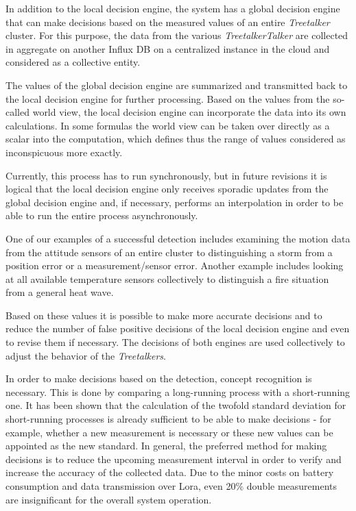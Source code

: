 In addition to the local decision engine, the system has a global decision engine that can make decisions based on the measured values of an entire \textit{Treetalker} cluster. 
For this purpose, the data from the various \textit{TreetalkerTalker} are collected in aggregate on another Influx DB on a centralized instance in the cloud and considered as a collective entity. 

The values of the global decision engine are summarized and transmitted back to the local decision engine for further processing. Based on the values from the so-called world view, the local decision engine can incorporate the data into its own calculations. In some formulas the world view can be taken over directly as a scalar into the computation, which defines thus the range of values considered as inconspicuous more exactly.

Currently, this process has to run synchronously, but in future revisions it is logical that the local decision engine only receives sporadic updates from the global decision engine and, if necessary, performs an interpolation in order to be able to run the entire process asynchronously.


One of our examples of a successful detection includes examining the motion data from the attitude sensors of an entire cluster to distinguishing a storm from a position error or a measurement/sensor error.
Another example includes looking at all available temperature sensors collectively to distinguish a fire situation from a general heat wave.


Based on these values it is possible to make more accurate decisions and to reduce the number of false positive decisions of the local decision engine and even to revise them if necessary. 
The decisions of both engines are used collectively to adjust the behavior of the \textit{Treetalkers}.

In order to make decisions based on the detection, concept recognition is necessary. This is done by comparing a long-running process with a short-running one. It has been shown that the calculation of the twofold standard deviation for short-running processes is already sufficient to be able to make decisions - for example, whether a new measurement is necessary or these new values can be appointed as the new standard. In general, the preferred method for making decisions is to reduce the upcoming measurement interval in order to verify and increase the accuracy of the collected data. Due to the minor costs on battery consumption and data transmission over Lora, even 20\% double measurements are insignificant for the overall system operation. 

